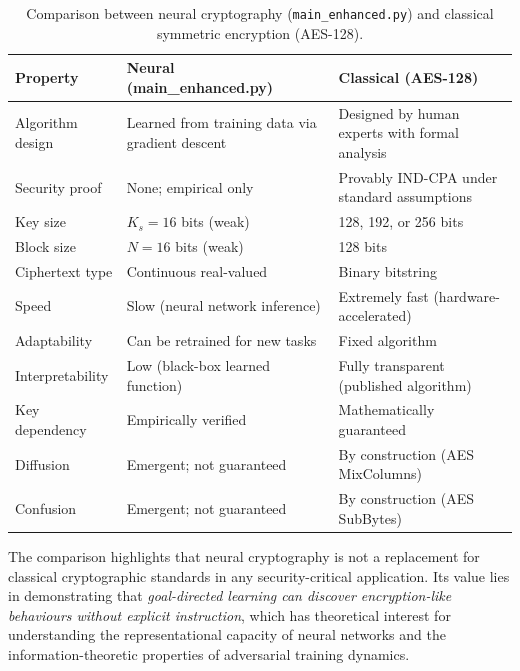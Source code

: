 \documentclass[12pt, a4paper]{article}
\newcommand{\code}[1]{\texttt{\color{CodeRed}#1}}
\begin{document}
\begin{table}[H]
  \centering
  \caption{Comparison between neural cryptography (\code{main\_enhanced.py})
           and classical symmetric encryption (AES-128).}
  \label{tab:classical_vs_neural}
  \renewcommand{\arraystretch}{1.5}
  \begin{tabularx}{\linewidth}{@{} l X X @{}}
    \toprule
    \textbf{Property} & \textbf{Neural (main\_enhanced.py)} &
    \textbf{Classical (AES-128)} \\
    \midrule
    Algorithm design   &
      Learned from training data via gradient descent &
      Designed by human experts with formal analysis \\
    Security proof     &
      None; empirical only &
      Provably IND-CPA under standard assumptions \\
    Key size           &
      $K_s = 16$ bits (weak) &
      128, 192, or 256 bits \\
    Block size         &
      $N = 16$ bits (weak) &
      128 bits \\
    Ciphertext type    &
      Continuous real-valued &
      Binary bitstring \\
    Speed              &
      Slow (neural network inference) &
      Extremely fast (hardware-accelerated) \\
    Adaptability       &
      Can be retrained for new tasks &
      Fixed algorithm \\
    Interpretability   &
      Low (black-box learned function) &
      Fully transparent (published algorithm) \\
    Key dependency     &
      Empirically verified &
      Mathematically guaranteed \\
    Diffusion          &
      Emergent; not guaranteed &
      By construction (AES MixColumns) \\
    Confusion          &
      Emergent; not guaranteed &
      By construction (AES SubBytes) \\
    \bottomrule
  \end{tabularx}
\end{table}

\noindent The comparison highlights that neural cryptography is not
a replacement for classical cryptographic standards in any security-critical
application. Its value lies in demonstrating that \emph{goal-directed
learning can discover encryption-like behaviours without explicit
instruction}, which has theoretical interest for understanding the
representational capacity of neural networks and the information-theoretic
properties of adversarial training dynamics.
\end{document}
